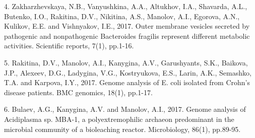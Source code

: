4. Zakharzhevskaya, N.B., Vanyushkina, A.A., Altukhov, I.A., Shavarda, A.L., Butenko, I.O., Rakitina, D.V., Nikitina, A.S., Manolov, A.I., Egorova, A.N., Kulikov, E.E. and Vishnyakov, I.E., 2017. Outer membrane vesicles secreted by pathogenic and nonpathogenic Bacteroides fragilis represent different metabolic activities. Scientific reports, 7(1), pp.1-16.


5. Rakitina, D.V., Manolov, A.I., Kanygina, A.V., Garushyants, S.K., Baikova, J.P., Alexeev, D.G., Ladygina, V.G., Kostryukova, E.S., Larin, A.K., Semashko, T.A. and Karpova, I.Y., 2017. Genome analysis of E. coli isolated from Crohn’s disease patients. BMC genomics, 18(1), pp.1-17.


6. Bulaev, A.G., Kanygina, A.V. and Manolov, A.I., 2017. Genome analysis of Acidiplasma sp. MBA-1, a polyextremophilic archaeon predominant in the microbial community of a bioleaching reactor. Microbiology, 86(1), pp.89-95.








